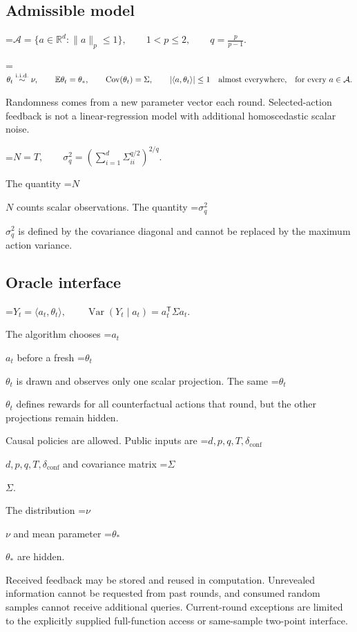 \documentclass[10pt,a4paper]{article}
\newcommand{\AtlasMath}[1]{\par\begingroup\centering\setbox0=\hbox{$\displaystyle #1$}\ifdim\wd0>1.4\linewidth\typeout{ATLAS WIDE FORMULA: \the\wd0}\fi\ifdim\wd0>\linewidth\resizebox{\linewidth}{!}{\box0}\else\box0\fi\par\endgroup}
\newcommand{\AtlasInlineMath}[1]{\begingroup\setbox0=\hbox{$#1$}\ifdim\wd0>.4\linewidth\endgroup\AtlasMath{#1}\else\endgroup$#1$\fi}
\begin{document}
\subsection{Admissible model}

\AtlasMath{\mathcal{A}=\{a\in\mathbb{R}^d:\|a\|_p\le1\},\qquad 1<p\le2,\qquad q=\frac{p}{p-1}.}



\AtlasMath{\theta_t\overset{\mathrm{i.i.d.}}\sim\nu,\qquad \mathbb{E}\theta_t=\theta_*,\qquad \operatorname{Cov}(\theta_t)=\Sigma,\qquad |\langle a,\theta_t\rangle|\le1\quad\text{\text{almost everywhere},\quad \text{for every} }a\in\mathcal{A}.}


Randomness comes from a new parameter vector each round. Selected-action feedback is not a linear-regression model with additional homoscedastic scalar noise.


\AtlasMath{N=T,\qquad \sigma_q^2=\left(\sum_{i=1}^{d}\Sigma_{ii}^{q/2}\right)^{2/q}.}


The quantity \AtlasInlineMath{N} counts scalar observations. The quantity \AtlasInlineMath{\sigma_q^2} is defined by the covariance diagonal and cannot be replaced by the maximum action variance.

\subsection{Oracle interface}

\AtlasMath{Y_t=\langle a_t,\theta_t\rangle,\qquad \operatorname{Var}(Y_t\mid a_t)=a_t^{\mathsf T}\Sigma a_t.}


The algorithm chooses \AtlasInlineMath{a_t} before a fresh \AtlasInlineMath{\theta_t} is drawn and observes only one scalar projection. The same \AtlasInlineMath{\theta_t} defines rewards for all counterfactual actions that round, but the other projections remain hidden.

Causal policies are allowed. Public inputs are \AtlasInlineMath{d,p,q,T,\delta_{\mathrm{conf}}} and covariance matrix \AtlasInlineMath{\Sigma}.

The distribution \AtlasInlineMath{\nu} and mean parameter \AtlasInlineMath{\theta_*} are hidden.

Received feedback may be stored and reused in computation. Unrevealed information cannot be requested from past rounds, and consumed random samples cannot receive additional queries. Current-round exceptions are limited to the explicitly supplied full-function access or same-sample two-point interface.
\end{document}
